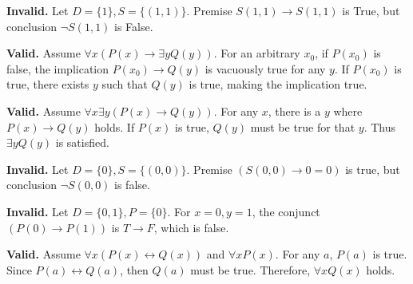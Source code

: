 \documentclass[12pt]{article}
\begin{document}
\begin{tcolorbox}[title=(a) Symmetry vs. Reflexivity]
\textbf{Invalid.} Let $D = \{1\}, S = \{(1,1)\}$. Premise $S(1,1) \to S(1,1)$ is True, but conclusion $\neg S(1,1)$ is False.
\end{tcolorbox}

\begin{tcolorbox}[title=(c) Universal-Existential Shift I]
\textbf{Valid.} Assume $\forall x(P(x) \to \exists y Q(y))$. For an arbitrary $x_0$, if $P(x_0)$ is false, the implication $P(x_0) \to Q(y)$ is vacuously true for any $y$. If $P(x_0)$ is true, there exists $y$ such that $Q(y)$ is true, making the implication true.
\end{tcolorbox}

\begin{tcolorbox}[title=(d) Universal-Existential Shift II]
\textbf{Valid.} Assume $\forall x \exists y(P(x) \to Q(y))$. For any $x$, there is a $y$ where $P(x) \to Q(y)$ holds. If $P(x)$ is true, $Q(y)$ must be true for that $y$. Thus $\exists y Q(y)$ is satisfied.
\end{tcolorbox}

\begin{tcolorbox}[title=(f) Antisymmetry vs. Irreflexivity]
\textbf{Invalid.} Let $D = \{0\}, S = \{(0,0)\}$. Premise $(S(0,0) \to 0=0)$ is true, but conclusion $\neg S(0,0)$ is false.
\end{tcolorbox}

\begin{tcolorbox}[title=(h) Global Equivalence]
\textbf{Invalid.} Let $D = \{0, 1\}, P = \{0\}$. For $x=0, y=1$, the conjunct $(P(0) \to P(1))$ is $T \to F$, which is false.
\end{tcolorbox}

\begin{tcolorbox}[title=(i) Bi-implication Distribution]
\textbf{Valid.} Assume $\forall x (P(x) \leftrightarrow Q(x))$ and $\forall x P(x)$. For any $a$, $P(a)$ is true. Since $P(a) \leftrightarrow Q(a)$, then $Q(a)$ must be true. Therefore, $\forall x Q(x)$ holds.
\end{tcolorbox}
\end{document}
